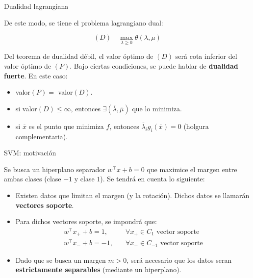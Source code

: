 \documentclass[handout, 9pt]{beamer}
\begin{document}
\begin{frame}{Dualidad lagrangiana}

De este modo, se tiene el problema lagrangiano dual:

\begin{equation*}
	(D)\quad \max_{\lambda\geq 0} \theta(\lambda,\mu)
\end{equation*}

Del teorema de dualidad débil, el valor óptimo de $(D)$ será cota inferior del valor óptimo de $(P)$. Bajo ciertas condiciones, se puede hablar de \textbf{dualidad fuerte}. En este caso:

\begin{itemize}
	\item valor$(P)=$ valor$(D)$.
	\item si valor$(D)\leq\infty$, entonces $\exists(\overline{\lambda},\overline{\mu})$ que lo minimiza.
	\item si $\overline{x}$ es el punto que minimiza $f$, entonces $\overline{\lambda}_i g_i(\overline{x})=0$ (holgura complementaria).
\end{itemize}
\end{frame}



\begin{frame}{SVM: motivación}

Se busca un hiperplano separador $w^\top x+b=0$ que maximice el margen entre ambas clases (clase $-1$ y clase $1$). Se tendrá en cuenta lo siguiente:

\begin{itemize}
	\item Existen datos que limitan el margen (y la rotación). Dichos datos se llamarán \textbf{vectores soporte}.
	\item Para dichos vectores soporte, se impondrá que:
	\begin{align*}
 	w^\top x_{+} + b = 1, &\quad\forall x_+\in C_1 \text{ vector soporte}\\
 	w^\top x_{-} + b = -1, &\quad\forall x_-\in C_{-1} \text{ vector soporte}
 \end{align*}
 	\item Dado que se busca un margen $m>0$, será necesario que los datos seran \textbf{estrictamente separables} (mediante un hiperplano).
\end{itemize}

\end{frame}
\end{document}
